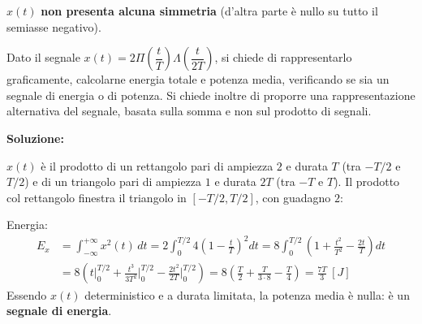 \documentclass[12pt, a4paper]{article}
\begin{document}
$x(t)$ \textbf{non presenta alcuna simmetria} (d'altra parte è nullo su tutto il semiasse negativo).

\bigskip

\begin{tcolorbox}[colback=lightergray!10, colframe=tocsec, title=\textbf{Esercizio 5}]
Dato il segnale $x(t)=2\Pi\!\left(\dfrac tT\right)\Lambda\!\left(\dfrac{t}{2T}\right)$, si chiede di rappresentarlo graficamente, calcolarne energia totale e potenza media, verificando se sia un segnale di energia o di potenza. Si chiede inoltre di proporre una rappresentazione alternativa del segnale, basata sulla somma e non sul prodotto di segnali.
\end{tcolorbox}

\textbf{Soluzione:}

$x(t)$ è il prodotto di un rettangolo pari di ampiezza $2$ e durata $T$ (tra $-T/2$ e $T/2$) e di un triangolo pari di ampiezza $1$ e durata $2T$ (tra $-T$ e $T$). Il prodotto col rettangolo finestra il triangolo in $[-T/2,T/2]$, con guadagno $2$:

\begin{center}
\quad
{}\quad
{}
\end{center}

Energia:
\begin{align*}
E_x &= \int_{-\infty}^{+\infty}x^2(t)\,dt = 2\int_0^{T/2}4\left(1-\frac tT\right)^2dt = 8\int_0^{T/2}\left(1+\frac{t^2}{T^2}-\frac{2t}{T}\right)dt \\
&= 8\left(t\Big|_0^{T/2}+\frac{t^3}{3T^2}\Big|_0^{T/2}-\frac{2t^2}{2T}\Big|_0^{T/2}\right) = 8\left(\frac T2+\frac{T}{3\cdot8}-\frac T4\right)=\frac{7T}{3}\ [J]
\end{align*}
Essendo $x(t)$ deterministico e a durata limitata, la potenza media è nulla: è un \textbf{segnale di energia}.
\end{document}

